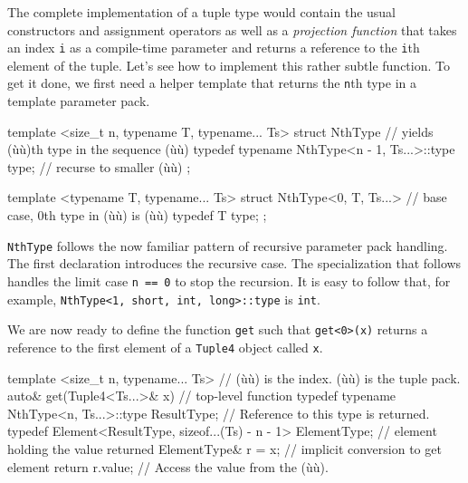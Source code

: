 \noindent The complete implementation of a tuple type would contain the usual
constructors and assignment operators as well as a \emph{projection
function} that takes an index \lstinline!i! as a compile-time parameter and
returns a reference to the \lstinline!i!th element of the tuple. Let's see
how to implement this rather subtle function. To get it done, we first
need a helper template that returns the \lstinline!n!th type in a template
parameter pack.

\begin{emcppslisting}
template <size_t n, typename T, typename... Ts>
struct NthType               // yields (ù{}ù)th type in the sequence (ù{}ù)
{
    typedef typename NthType<n - 1, Ts...>::type
        type;                // recurse to smaller (ù{}ù)
};

template <typename T, typename... Ts>
struct NthType<0, T, Ts...>  // base case, 0th type in (ù{}ù) is (ù{}ù)
{
    typedef T type;
};
\end{emcppslisting}
    

\noindent \lstinline!NthType! follows the now familiar pattern of recursive parameter
pack handling. The first declaration introduces the recursive case. The
specialization that follows handles the limit case
\lstinline!n!~\lstinline!==!~\lstinline!0! to stop the recursion. It is easy to
follow that, for example,\linebreak%
\lstinline!NthType<1,!~\lstinline!short,!~\lstinline!int,!~\lstinline!long>::type!
is \lstinline!int!.

We are now ready to define the function \lstinline!get! such that
\lstinline!get<0>(x)! returns a reference to the first element of a
\lstinline!Tuple4! object called \lstinline!x!.

\begin{emcppslisting}
template <size_t n, typename... Ts>  // (ù{}ù) is the index. (ù{}ù) is the tuple pack.
auto& get(Tuple4<Ts...>& x)          // top-level function
{
    typedef typename NthType<n, Ts...>::type
        ResultType;                  // Reference to this type is returned.
    typedef Element<ResultType, sizeof...(Ts) - n - 1>
        ElementType;                 // element holding the value returned
    ElementType& r = x;              // implicit conversion to get element
    return r.value;                  // Access the value from the (ù{}ù).
}
\end{emcppslisting}
    

